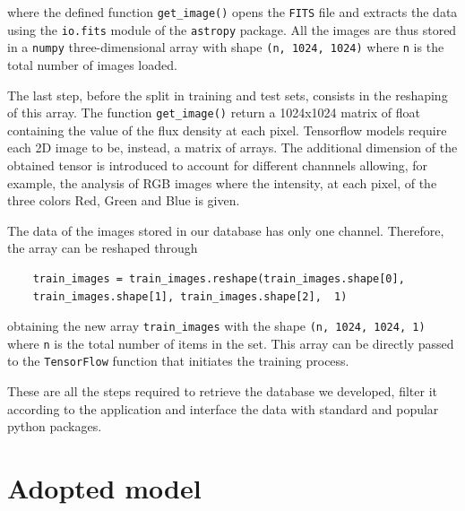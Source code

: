 \documentclass[a4paper,10pt]{report}
\begin{document}
where the defined function \lstinline{get_image()} opens the \lstinline{FITS} file 
and extracts
the data using the \lstinline{io.fits} module of 
the \lstinline{astropy} package. All the images are thus
stored in a \lstinline{numpy} three-dimensional array 
with shape \lstinline{(n, 1024, 1024)} where \lstinline{n} is the total number of images loaded.

The last step, before the split in training and test sets, consists 
in the reshaping of this array. The  
function \lstinline{get_image()} return a 1024x1024 matrix of float containing
the value of the flux density at each pixel. 
Tensorflow models require each 2D image to be, instead, a matrix of arrays.
The additional dimension of the obtained tensor is introduced to account for 
different channnels allowing, for example, the analysis of RGB images where 
the intensity, at each pixel, of the three colors Red, Green and Blue is given.

The data of the images stored in our database has only one channel. Therefore,
the array can be reshaped through

\begin{lstlisting}
    train_images = train_images.reshape(train_images.shape[0], 
    train_images.shape[1], train_images.shape[2],  1)
\end{lstlisting}

obtaining the new array \lstinline{train_images} with the shape \lstinline{(n, 1024, 1024, 1)}
where \lstinline{n} is the total number of items in the set.
This array can be directly passed to the \lstinline{TensorFlow} function that initiates
the training process.

These are all the steps required to retrieve the database we developed, filter it according to the application
and interface the data with standard and popular python packages.

\section{Adopted model}

\end{document}
